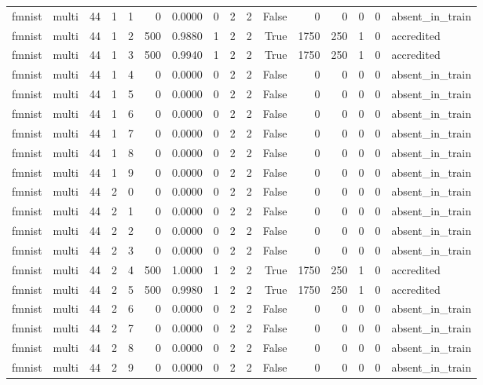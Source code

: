 \begin{tabular}{llrrrrrrrrrrrrrl}
fmnist & multi & 44 & 1 & 1 & 0 & 0.0000 & 0 & 2 & 2 & False & 0 & 0 & 0 & 0 & absent\_in\_train \\
fmnist & multi & 44 & 1 & 2 & 500 & 0.9880 & 1 & 2 & 2 & True & 1750 & 250 & 1 & 0 & accredited \\
fmnist & multi & 44 & 1 & 3 & 500 & 0.9940 & 1 & 2 & 2 & True & 1750 & 250 & 1 & 0 & accredited \\
fmnist & multi & 44 & 1 & 4 & 0 & 0.0000 & 0 & 2 & 2 & False & 0 & 0 & 0 & 0 & absent\_in\_train \\
fmnist & multi & 44 & 1 & 5 & 0 & 0.0000 & 0 & 2 & 2 & False & 0 & 0 & 0 & 0 & absent\_in\_train \\
fmnist & multi & 44 & 1 & 6 & 0 & 0.0000 & 0 & 2 & 2 & False & 0 & 0 & 0 & 0 & absent\_in\_train \\
fmnist & multi & 44 & 1 & 7 & 0 & 0.0000 & 0 & 2 & 2 & False & 0 & 0 & 0 & 0 & absent\_in\_train \\
fmnist & multi & 44 & 1 & 8 & 0 & 0.0000 & 0 & 2 & 2 & False & 0 & 0 & 0 & 0 & absent\_in\_train \\
fmnist & multi & 44 & 1 & 9 & 0 & 0.0000 & 0 & 2 & 2 & False & 0 & 0 & 0 & 0 & absent\_in\_train \\
fmnist & multi & 44 & 2 & 0 & 0 & 0.0000 & 0 & 2 & 2 & False & 0 & 0 & 0 & 0 & absent\_in\_train \\
fmnist & multi & 44 & 2 & 1 & 0 & 0.0000 & 0 & 2 & 2 & False & 0 & 0 & 0 & 0 & absent\_in\_train \\
fmnist & multi & 44 & 2 & 2 & 0 & 0.0000 & 0 & 2 & 2 & False & 0 & 0 & 0 & 0 & absent\_in\_train \\
fmnist & multi & 44 & 2 & 3 & 0 & 0.0000 & 0 & 2 & 2 & False & 0 & 0 & 0 & 0 & absent\_in\_train \\
fmnist & multi & 44 & 2 & 4 & 500 & 1.0000 & 1 & 2 & 2 & True & 1750 & 250 & 1 & 0 & accredited \\
fmnist & multi & 44 & 2 & 5 & 500 & 0.9980 & 1 & 2 & 2 & True & 1750 & 250 & 1 & 0 & accredited \\
fmnist & multi & 44 & 2 & 6 & 0 & 0.0000 & 0 & 2 & 2 & False & 0 & 0 & 0 & 0 & absent\_in\_train \\
fmnist & multi & 44 & 2 & 7 & 0 & 0.0000 & 0 & 2 & 2 & False & 0 & 0 & 0 & 0 & absent\_in\_train \\
fmnist & multi & 44 & 2 & 8 & 0 & 0.0000 & 0 & 2 & 2 & False & 0 & 0 & 0 & 0 & absent\_in\_train \\
fmnist & multi & 44 & 2 & 9 & 0 & 0.0000 & 0 & 2 & 2 & False & 0 & 0 & 0 & 0 & absent\_in\_train \\

\end{tabular}

